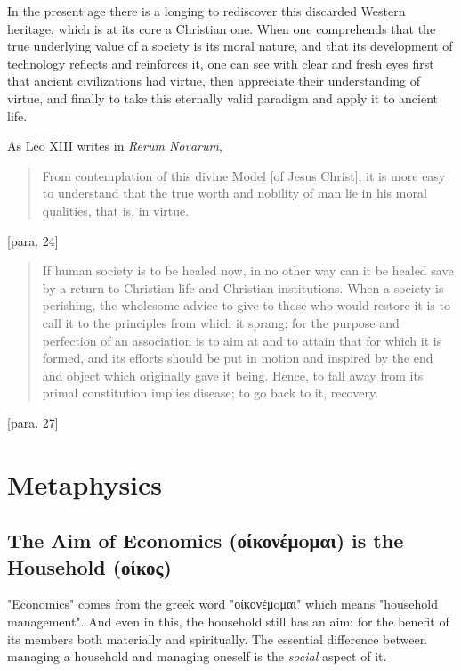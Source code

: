 \documentclass[letterpaper]{article}
\begin{document}
In the present age there is a longing to rediscover this discarded Western heritage, which is at its core a Christian one. When one comprehends that the true underlying value of a society is its moral nature, and that its development of technology reflects and reinforces it, one can see with clear and fresh eyes first that ancient civilizations had virtue, then appreciate their understanding of virtue, and finally to take this eternally valid paradigm and apply it to ancient life.

As Leo XIII writes in \textit{Rerum Novarum},

\begin{quote}
  From contemplation of this divine Model [of Jesus Christ], it is more easy to understand that the true worth and nobility of man lie in his moral qualities, that is, in virtue.
\end{quote} [para. 24]

\begin{quote}
  If human society is to be healed now, in no other way can it be healed save by a return to Christian life and Christian institutions. When a society is perishing, the wholesome advice to give to those who would restore it is to call it to the principles from which it sprang; for the purpose and perfection of an association is to aim at and to attain that for which it is formed, and its efforts should be put in motion and inspired by the end and object which originally gave it being. Hence, to fall away from its primal constitution implies disease; to go back to it, recovery.
\end{quote} [para. 27]

\section{Metaphysics}

\subsection{The Aim of Economics (οίκονέμoμαι) is the Household (οίκος)}

"Economics" comes from the greek word "οίκονέμoμαι" which means "household management". And even in this, the household still has an aim: for the benefit of its members both materially and spiritually. The essential difference between managing a household and managing oneself is the \textit{social} aspect of it.

\end{document}
